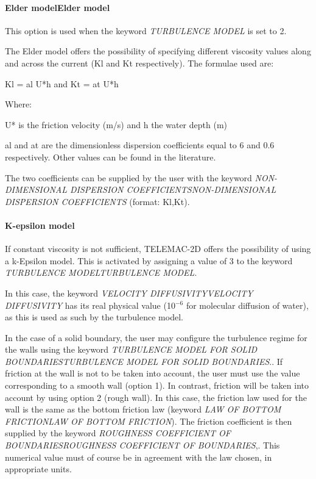 \documentclass{article} %
\begin{document}
\paragraph{ Elder modelElder model}

 This option is used when the keyword \textit{TURBULENCE MODEL} is set to 2.

 The Elder model offers the possibility of specifying different viscosity values along and across the current (Kl and Kt respectively). The formulae used are:

  Kl = al U*h and  Kt = at U*h

 Where:

 U* is the friction velocity (m/s) and h the water depth (m)

 al and at are the dimensionless dispersion coefficients equal to 6 and 0.6 respectively. Other values can be found in the literature.

 The two coefficients can be supplied by the user with the keyword \textit{NON-DIMENSIONAL DISPERSION COEFFICIENTSNON-DIMENSIONAL DISPERSION COEFFICIENTS} (format: Kl,Kt).


\paragraph{ K-epsilon model}

 If constant viscosity is not sufficient, TELEMAC-2D offers the possibility of using a k-Epsilon model. This is activated by assigning a value of 3 to the keyword \textit{TURBULENCE MODELTURBULENCE MODEL}.

 In this case, the keyword \textit{VELOCITY DIFFUSIVITYVELOCITY DIFFUSIVITY} has its real physical value (10${}^{-6}$ for molecular diffusion of water), as this is used as such by the turbulence model.

 In the case of a solid boundary, the user may configure the turbulence regime for the walls using the keyword \textit{TURBULENCE MODEL FOR SOLID BOUNDARIESTURBULENCE MODEL FOR SOLID BOUNDARIES}.. If friction at the wall is not to be taken into account, the user must use the value corresponding to a smooth wall (option 1). In contrast, friction will be taken into account by using option 2 (rough wall). In this case, the friction law used for the wall is the same as the bottom friction law (keyword \textit{LAW OF BOTTOM FRICTIONLAW OF BOTTOM FRICTION}). The friction coefficient is then supplied by the keyword \textit{ROUGHNESS COEFFICIENT OF BOUNDARIESROUGHNESS COEFFICIENT OF BOUNDARIES},. This numerical value must of course be in agreement with the law chosen, in appropriate units.
\end{document}
